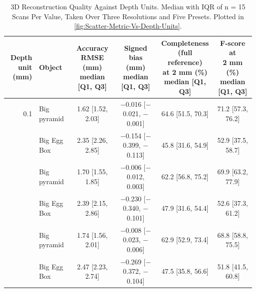 \begin{table}[H]
	\centering
	\footnotesize
	\setlength{\tabcolsep}{4pt}
	\caption{3D Reconstruction Quality Against Depth Units. Median with IQR of n = 15 Scans Per Value, Taken Over Three Resolutions and Five Presets. Plotted in \autoref{fig:Scatter-Metric-Vs-Depth-Units}.}
	\label{tab:Scatter_Metric_Vs_Depth_Units}
	\begin{tabular}{r l *{4}{c}}
		\toprule
		\makecell{Depth\\unit (mm)} & Object & \makecell{Accuracy\\RMSE (mm)\\{\scriptsize median [Q1, Q3]}} & \makecell{Signed\\bias (mm)\\{\scriptsize median [Q1, Q3]}} & \makecell{Completeness\\(full reference)\\at 2 mm (\%)\\{\scriptsize median [Q1, Q3]}} & \makecell{F-score at\\2 mm (\%)\\{\scriptsize median [Q1, Q3]}} \\
		\midrule
		0.1 & Big pyramid & 1.62 [1.52, 2.03] & $-$0.016 [$-$0.021, $-$0.001] & 64.6 [51.5, 70.3] & 71.2 [57.3, 76.2] \\
		 & Big Egg Box & 2.35 [2.26, 2.85] & $-$0.154 [$-$0.399, $-$0.113] & 45.8 [31.6, 54.9] & 52.9 [37.5, 58.7] \\
		\addlinespace
		0.5 & Big pyramid & 1.70 [1.55, 1.85] & $-$0.006 [$-$0.012, 0.003] & 62.2 [56.8, 75.2] & 69.9 [63.2, 77.9] \\
		 & Big Egg Box & 2.39 [2.15, 2.86] & $-$0.230 [$-$0.340, $-$0.101] & 47.9 [31.6, 54.4] & 52.6 [37.3, 61.2] \\
		\addlinespace
		1 & Big pyramid & 1.74 [1.56, 2.01] & $-$0.008 [$-$0.023, $-$0.006] & 62.9 [52.9, 73.4] & 68.8 [58.8, 75.5] \\
		 & Big Egg Box & 2.47 [2.23, 2.74] & $-$0.269 [$-$0.372, $-$0.104] & 47.5 [35.8, 56.6] & 51.8 [41.5, 60.8] \\
		\bottomrule
	\end{tabular}
\end{table}
